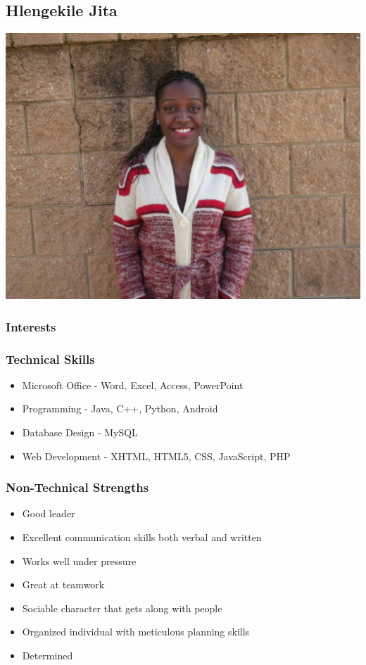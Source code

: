\documentclass{scrartcl}
\begin{document}
\subsection{Hlengekile Jita}
\includegraphics[width=\textwidth]{images/Hlengi}
\subsubsection{Interests}
\subsubsection{Technical Skills}
\begin{itemize}
\item Microsoft Office - Word, Excel, Access, PowerPoint
\item Programming - Java, C++, Python, Android
\item Database Design - MySQL
\item Web Development - XHTML, HTML5, CSS, JavaScript, PHP
\end{itemize}
\subsubsection{Non-Technical Strengths}
\begin{itemize}
\item Good leader
\item Excellent communication skills both verbal and written
\item Works well under pressure
\item Great at teamwork
\item Sociable character that gets along with people
\item Organized individual with meticulous planning skills
\item Determined
\end{itemize}
\end{document}
